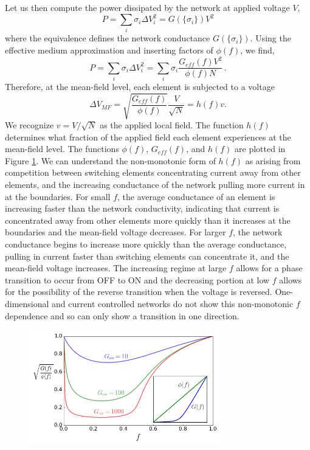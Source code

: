 \documentclass[aps,prl,reprint,groupedaddress]{revtex4-1}
\begin{document}
Let us then compute the power dissipated by the network at applied
voltage $V$,
\begin{equation}
P = \sum_i \sigma_i \Delta V_i^2 = G(\{\sigma_i\}) V^2
\end{equation}
where the equivalence defines the network conductance $G(\{\sigma_i\})$.
Using the effective medium approximation and inserting factors of $\phi(f)$,
we find,
\begin{equation}
P = \sum_i \sigma_i \Delta V_i^2 = \sum_i \sigma_i \frac{G_{eff}(f)V^2}
{\phi(f) N}\,.
\end{equation}
Therefore, at the mean-field level, each element is subjected to a voltage
\begin{equation}
\Delta V_{MF} = \sqrt{\frac{G_{eff}(f)}{\phi(f)}}\frac{V}{\sqrt{N}}
= h(f) v.
\end{equation}
We recognize $v=V/\sqrt{N}$ as the applied local field.  The function
$h(f)$ determines what fraction of the applied field each element
experiences at the mean-field level.  The functions $\phi(f)$, $G_{eff}(f)$,
and $h(f)$ are plotted in Figure \ref{MF_voltage_fig}. We can understand the non-monotonic
form of $h(f)$ as arising from competition between switching elements
concentrating current away from other elements, and the increasing conductance
of the network pulling more current in at the boundaries.  For small $f$, the
average conductance of an element is increasing faster than the network
conductivity, indicating that current is concentrated away from other elements
more quickly than it increases at the boundaries and the mean-field voltage
decreases.  For larger $f$, the network conductance begins to increase more
quickly than the average conductance, pulling in current faster than switching
elements can concentrate it, and the mean-field voltage increases.  The
increasing regime at large $f$ allows for a phase transition to occur from
OFF to ON and the decreasing portion at low $f$ allows for the possibility
of the reverse transition when the voltage is reversed.  One-dimensional and
current controlled networks do not show this non-monotonic $f$ dependence and
so can only show a transition in one direction.

\begin{figure}
\includegraphics[width=8.3cm]{MF_voltage.png}
\caption{\label{MF_voltage_fig}}
\end{figure}
\end{document}
